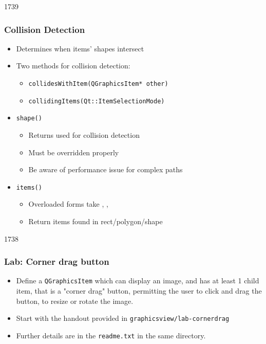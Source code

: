 \begin{slide}{1739}

\frametitle{Collision Detection}
\begin{itemize}
\item Determines when items' shapes intersect
\item Two methods for collision detection:
    \begin{itemize}
    \item \texttt{collidesWithItem(QGraphicsItem* other)}
    \item \texttt{collidingItems(Qt::ItemSelectionMode)}
    \end{itemize}
\item \texttt{shape()}
    \begin{itemize}
    \item Returns  used for collision detection
    \item Must be overridden properly
    \item Be aware of performance issue for complex paths
    \end{itemize}
\item \texttt{items()}
    \begin{itemize}
    \item Overloaded forms take , , 

    \item Return items found in rect/polygon/shape
    \end{itemize}
\end{itemize}

\end{slide}

\begin{slide}{1738}
\frametitle{Lab: Corner drag button}
\begin{itemize}
\item Define a \texttt{QGraphicsItem} which can display an image, and has at least 1 child item, that is a "corner drag" button, permitting the user to click and drag the button, to resize or rotate the image. 
\item Start with the handout provided in \texttt{graphicsview/lab-cornerdrag}
\item Further details are in the \texttt{readme.txt} in the same directory.
\end{itemize}
\end{slide}



